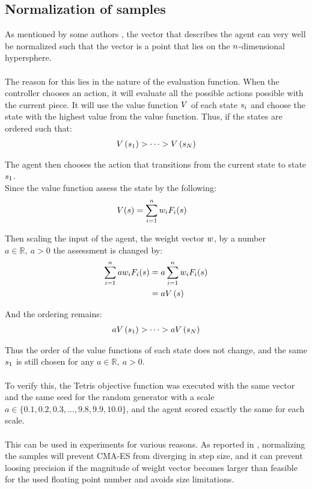 \subsection{Normalization of samples \label{normalSamples}}
As mentioned by some authors \citep{boumaza2009}, the vector that
describes the agent can very well be normalized such that the vector
is a point that lies on the $n$-dimensional hypersphere.\\
\\
The reason for this lies in the nature of the evaluation function.
When the controller chooses an action, it will evaluate all the 
possible actions possible with the current piece. It will use the 
value function $V$ of each state $s_i$ and 
choose the state with the highest value from the value function.
Thus, if the states are ordered such that:
\begin{align*}
V \left(  s_1 \right) 
> \dots 
> V \left( s_N \right)
\end{align*}

The agent then chooses the action that transitions from the current state 
to state $s_1$.\\
Since the value function assess the state by the following:
\begin{align*}
V (s ) &= 
\sum_{i=1}^{n} w _{i}F _{i}(s )
\end{align*}

Then scaling the input of the agent, the weight vector $w$, by a
number $a \in \mathbb{R}, \ a > 0$ the assessment is changed by:
\begin{align*}
\sum_{i=1}^{n} a w _{i}F _{i}(s ) &= 
a\sum_{i=1}^{n} w _{i}F _{i}(s )\\
&= a V \left( s \right)
\end{align*}

And the ordering remains:
\begin{align*}
a V \left(  s_1 \right) 
> \dots 
> a V \left( s_N \right)
\end{align*}

Thus the order of the value functions of 
each state does not change, and the same $s_1$
is still chosen for any $a \in \mathbb{R}, \ a > 0$.\\
\\
To verify this, the Tetris objective function was executed with the
same vector and the same seed for the random generator with a scale
$a \in \{0.1, 0.2,0.3, \dots, 9.8,9.9,10.0\}$, and the agent scored 
exactly the same for each scale.\\
\\
This can be used in experiments for various reasons. As reported 
in \citep{boumaza2009}, normalizing the samples will 
prevent CMA-ES from diverging in step size,
and it can prevent loosing precision if the magnitude of weight 
vector becomes larger than feasible for the used floating 
point number and avoids size limitations.



